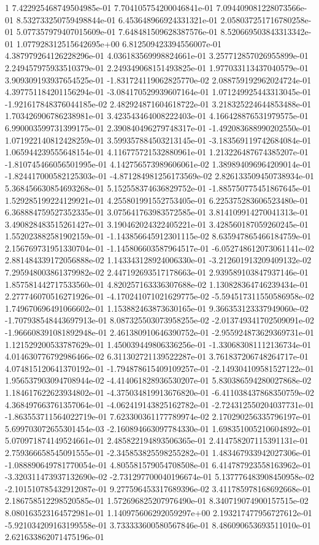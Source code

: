 1	7.422925468749504985e-01	7.704105754200046841e-01	7.094409081228073566e-01	8.532733250759498844e-01	6.453648966924331321e-01	2.058037251716780258e-01	5.077357979407015609e-01	7.648481509628387576e-01	8.520669503843313342e-01	1.077928312515642695e+00	6.812509423394556007e-01	4.387979264126228296e-01	4.036183569998824661e-01	3.257712857026955899e-01	2.249457975933510379e-01	2.249349068151493825e-01	1.977033113437040579e-01	3.909309193937654525e-01	-1.831724119062825770e-02	2.088759192962024724e-01	4.397751184201156294e-01	-3.084170529939607164e-01	1.071249925443313045e-01	-1.921617848376044185e-02	2.482924871604618722e-01	3.218325224644853488e-01	1.703426906786238981e-01	3.423543464008222403e-01	4.166428876531979575e-01	6.990003599731399175e-01	2.390840496279748317e-01	-1.492083688990202550e-01	1.071922140812428259e-01	3.599357884503213145e-01	-3.183569119742684084e-01	1.065944239555648154e-01	4.116775721532880961e-01	1.213226487674385207e-01	-1.810745466056501995e-01	4.142756573989606061e-02	1.389894096964209014e-01	-1.824417000582125303e-01	-4.871284981256173569e-02	2.826133509450738934e-01	5.368456630854693268e-01	5.152558374636829752e-01	-1.885750775451867645e-01	1.529285199224129921e-01	4.255801991552753405e-01	6.225375283606523480e-01	6.368884759527352335e-01	3.075641763983572585e-01	3.814109914270041313e-01	3.490828483515261427e-01	3.190462024322405221e-01	3.428560187059260245e-01	1.552023882581902159e-01	-1.143856645912301115e-02	8.635947865466184759e-01	2.156769731951330704e-01	-1.145806603587964517e-01	-6.052748612073061141e-02	2.881484339172056888e-02	1.143343128924006330e-01	-3.212601913209409132e-02	7.295948003861379982e-02	2.447192693517178663e-01	2.939589103847937146e-01	1.857581442717533560e-01	4.820257163336307688e-02	1.130828364746239434e-01	2.277746070516271926e-01	-4.170241071021629775e-02	-5.594517311550586958e-02	1.749670696491066602e-01	1.153882463873630165e-01	9.366353123337949060e-02	-1.707938548443697913e-01	8.087325503073958255e-02	-2.013749341702509091e-02	-1.966608391081892948e-01	2.461380910646390752e-01	-2.955924873629369731e-01	1.121529200533787629e-01	1.450039449806336256e-01	-1.330683081112136734e-01	4.014630776792986466e-02	6.311302721139522287e-01	3.761837206748264717e-01	4.074815120641370192e-01	-1.794878615409109257e-01	-2.149304109581527122e-01	1.956537903094708944e-02	-4.414061828936530207e-01	5.830386594280027868e-02	1.184617622623934802e-01	-4.375034819913676820e-01	-6.411038437868350759e-02	4.368497663761357064e-01	-4.062419143825162782e-01	-2.724312550204037731e-01	-1.863553711564022719e-01	7.623300361177789974e-02	2.170290256335796197e-01	5.699703072655301454e-03	-2.160894663097784330e-01	1.698351005210604892e-01	5.070971874149524661e-01	2.485822194893506365e-01	2.414758207115391131e-01	2.759366658545091555e-01	-2.345853825598255282e-01	1.483467933942027306e-01	-1.088890649781770054e-01	4.805581579054708508e-01	6.414787923558163962e-01	-3.320311473937132690e-02	-2.731297700040196674e-01	5.137776483908450958e-02	-2.101510785432912087e-01	9.277596453317689396e-02	3.411785978168692668e-01	2.186758512298520585e-01	1.572696825207976490e-01	8.340719074900157515e-02	8.080163523164572981e-01	1.140975606292059297e+00	2.193217477956727612e-01	-5.921034209163199558e-01	3.733333600580567846e-01	8.486090653693511010e-01	2.621633862071475196e-01